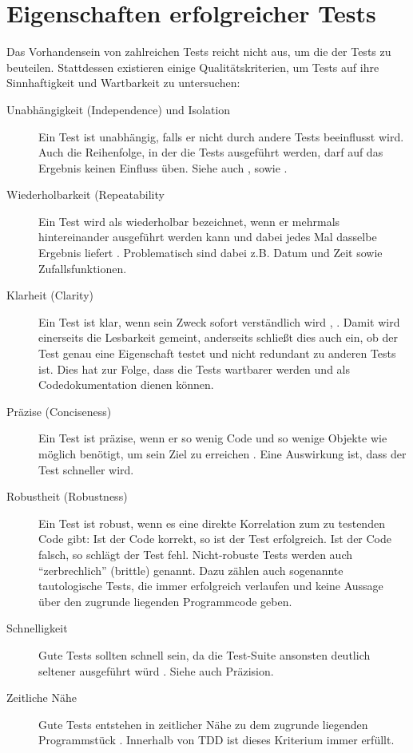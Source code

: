 \appendix

\chapter{Eigenschaften erfolgreicher Tests}

Das Vorhandensein von zahlreichen Tests reicht nicht aus, um die  der Tests zu beuteilen. Stattdessen existieren einige Qualitätskriterien, um Tests auf ihre Sinnhaftigkeit und Wartbarkeit zu untersuchen:

\begin{description}
 \item[Unabhängigkeit (Independence) und Isolation] Ein Test ist unabhängig, falls er nicht durch andere Tests beeinflusst wird. Auch die Reihenfolge, in der die Tests ausgeführt werden, darf auf das Ergebnis keinen Einfluss üben. Siehe auch \citep{beck_test_2002}, \citep{palermo_guidelines_2006} sowie \citep[Karte 45]{langr_agile_2011}.
 \item[Wiederholbarkeit (Repeatability] Ein Test wird als wiederholbar bezeichnet, wenn er mehrmals hintereinander ausgeführt werden kann und dabei jedes Mal dasselbe Ergebnis liefert \citep[Karte 45]{langr_agile_2011} \citep{rappin_rails_2011}. Problematisch sind dabei z.B. Datum und Zeit sowie Zufallsfunktionen.
 \item[Klarheit (Clarity)] Ein Test ist klar, wenn sein Zweck sofort verständlich wird \citep{rappin_rails_2011}, \citep{palermo_guidelines_2006}. Damit wird einerseits die Lesbarkeit gemeint, anderseits schließt dies auch ein, ob der Test genau eine Eigenschaft testet und nicht redundant zu anderen Tests ist. Dies hat zur Folge, dass die Tests wartbarer werden und als Codedokumentation dienen können.
 \item[Präzise (Conciseness)] Ein Test ist präzise, wenn er so wenig Code und so wenige Objekte wie möglich benötigt, um sein Ziel zu erreichen \citep{palermo_guidelines_2006} \citep{rappin_rails_2011}. Eine Auswirkung ist, dass der Test schneller wird.
 \item[Robustheit (Robustness)] Ein Test ist robust, wenn es eine direkte Korrelation zum zu testenden Code gibt: Ist der Code korrekt, so ist der Test erfolgreich. Ist der Code falsch, so schlägt der Test fehl. Nicht-robuste Tests werden auch "`zerbrechlich"' (brittle) genannt. Dazu zählen auch sogenannte tautologische Tests, die immer erfolgreich verlaufen und keine Aussage über den zugrunde liegenden Programmcode geben.
 \item[Schnelligkeit] Gute Tests sollten schnell sein, da die Test-Suite ansonsten deutlich seltener ausgeführt würd \citep{langr_agile_2011} \citep{palermo_guidelines_2006} \citep{nagappan_realizing_2008}. Siehe auch Präzision.
 \item[Zeitliche Nähe] Gute Tests entstehen in zeitlicher Nähe zu dem zugrunde liegenden Programmstück \citep{langr_agile_2011}. Innerhalb von TDD ist dieses Kriterium immer erfüllt.
 \end{description}

